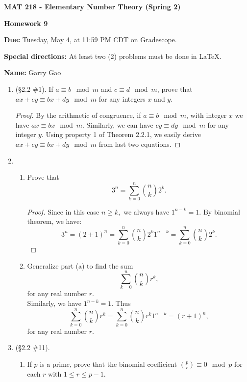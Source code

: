 \documentclass[11pt,a4paper]{article}
\begin{document}
\begin{Large}
\centerline{\bf MAT 218 - Elementary Number Theory (Spring 2)}\medskip
\centerline{\bf Homework 9}\medskip
\end{Large}
{\bf Due:} Tuesday, May 4, at 11:59 PM CDT on Gradescope.

{\bf Special directions:}  At least two (2) problems must be done in \LaTeX.

{\bf Name:} Garry Gao

\hrulefill

\begin{enumerate}

	\item (\S 2.2 \#1).  If \(a \equiv b \mod m\) and \(c \equiv d \mod m\), prove that \(ax+cy \equiv bx+dy \mod m\) for any integers \(x\) and \(y\).

	\begin{proof}
		By the arithmetic of congruence, if \(a \equiv b \mod m\), with integer $x$ we have \(ax \equiv bx \mod m.\) Similarly, we can have \(cy \equiv dy \mod m\) for any integer $y$. Using property 1 of Theorem 2.2.1, we easily derive \(ax+cy \equiv bx+dy \mod m\) from last two equations.
	\end{proof}

	\item
	\begin{enumerate}
		\item Prove that
		\[ 3^{n} = \sum_{k=0}^{n} \binom{n}{k} 2^{k}. \]

		\begin{proof}
			Since in this case $n \geq k,$ we always have $1^{n-k} = 1.$ By binomial theorem, we have:
			\[ 3^{n} = (2+1)^n = \sum_{k=0}^{n} \binom{n}{k} 2^{k} 1^{n-k} = \sum_{k=0}^{n} \binom{n}{k} 2^{k}. \]
		\end{proof}

		\item Generalize part (a) to find the sum
		\[\sum_{k=0}^{n} \binom{n}{k} r^{k}, \]
		for any real number \(r\).\\

		Similarly, we have $1^{n-k} = 1.$ Thus \[\sum_{k=0}^{n} \binom{n}{k} r^{k} =  \sum_{k=0}^{n} \binom{n}{k} r^{k} 1^{n-k} = (r+1)^n,\] for any real number $r$.
	\end{enumerate}

	\item (\S 2.2 \#11).
	\begin{enumerate}
		\item If \(p\) is a prime, prove that the binomial coefficient \( \binom{p}{r} \equiv 0 \mod p \) for each \(r\) with \(1 \le r \le p-1\).


\end{enumerate}
\end{enumerate}
\end{document}
